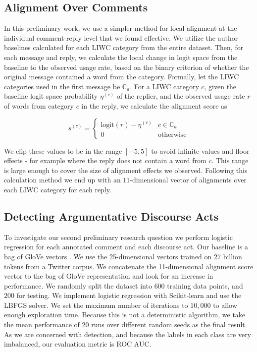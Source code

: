 \documentclass[11pt,a4paper]{article}
\begin{document}
\subsection{Alignment Over Comments}

In this preliminary work, we use a simpler method for local alignment at the individual comment-reply level that we found effective. We utilize the author baselines calculated for each LIWC category from the entire dataset. Then, for each message and reply, we calculate the local change in logit space from the baseline to the observed usage rate, based on the binary criterion of whether the original message contained a word from the category. Formally, let the LIWC categories used in the first message be $\mathbb{C}_a$. For a LIWC category $c$, given the baseline logit space probability $\eta^{(c)}$ of the replier, and the observed usage rate $r$ of words from category $c$ in the reply, we calculate the alignment score as

\begin{equation*}
    s^{(c)} = 
    \begin{cases}
        \text{logit}(r) - \eta^{(c)} & c \in \mathbb{C}_a \\
        0 & \text{otherwise}
    \end{cases}
\end{equation*}

\vspace{6pt}

\noindent
We clip these values to be in the range $[-5, 5]$ to avoid infinite values and floor effects - for example where the reply does not contain a word from $c$. This range is large enough to cover the size of alignment effects we observed. Following this calculation method we end up with an $11$-dimensional vector of alignments over each LIWC category for each reply.

\subsection{Detecting Argumentative Discourse Acts}

To investigate our second preliminary research question we perform logistic regression for each annotated comment and each discourse act. Our baseline is a bag of GloVe vectors \cite{PenningtonSM14}. We use the 25-dimensional vectors trained on 27 billion tokens from a Twitter corpus. We concatenate the 11-dimensional alignment score vector to the bag of GloVe representation and look for an increase in performance. We randomly split the dataset into $600$ training data points, and $200$ for testing. We implement logistic regression with Scikit-learn \cite{Pedregosa11} and use the LBFGS solver. We set the maximum number of iterations to $10,000$ to allow enough exploration time. Because this is not a deterministic algorithm, we take the mean performance of 20 runs over different random seeds as the final result. As we are concerned with detection, and because the labels in each class are very imbalanced, our evaluation metric is ROC AUC.
\end{document}
